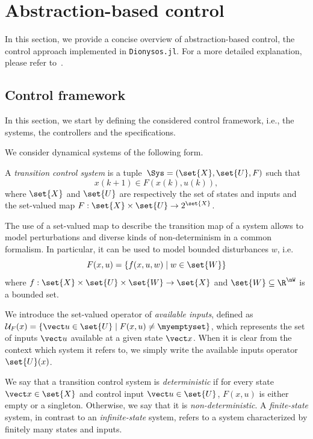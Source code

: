 \documentclass{juliacon}
\begin{document}
\section{Abstraction-based control} \label{sec:abstraction}

In this section, we provide a concise overview of abstraction-based control, the control approach implemented in \texttt{Dionysos.jl}. For a more detailed explanation, please refer to~\cite{tabuada2009verification,reissig2016feedback}.

\subsection{Control framework}

In this section, we start by defining the considered control framework, i.e., the systems, the controllers and the specifications.

\vskip 6pt

We consider dynamical systems of the following form.
\begin{defi}\label{def:sys}
A \emph{transition control system} is a tuple~$\Sys = (\set{X}, \set{U}, F)$ such that
$$x(k+1)\in F(x(k), u(k)),$$
where $\set{X}$ and $\set{U}$ are respectively the set of states and inputs and the set-valued map $F:\set{X}\times \set{U}\rightarrow 2^{\set{X}}$.
\end{defi}

The use of a set-valued map to describe the transition map of a system allows to model perturbations and diverse kinds of non-determinism in a common formalism.
% 
In particular, it can be used to model bounded disturbances $w$, i.e.
\begin{equation}\label{eq:bounded_disturbances}
    F(x,u) = \{f(x,u,w) \mid w\in \set{W}\}
\end{equation}
where $f:\set{X}\times \set{U}\times \set{W}\rightarrow \set{X}$ and $\set{W}\subseteq \R^{\nW}$ is a bounded set.

\vskip 6pt

%
We introduce the set-valued operator of  \emph{available inputs}, defined as $\mathcal{U}_F(x) = \{ \vect u \in \set{U} \mid F(x,u) \neq \myemptyset \}$, which represents the set of inputs $\vect u$ available at a given state $\vect x$. When it is clear from the context which system it refers to, we simply write the available inputs operator~$\set{U}(x)$.

\vskip 6pt
%
We say that a transition control system is \emph{deterministic} if for every state $\vect x \in \set{X}$ and control input $\vect u \in \set{U}$, $F(x,u)$ is either empty or a singleton. Otherwise, we say that it is \emph{non-deterministic}. %
A \emph{finite-state} system, in contrast to an \emph{infinite-state} system, refers to a system characterized by finitely many states and inputs.
\end{document}
